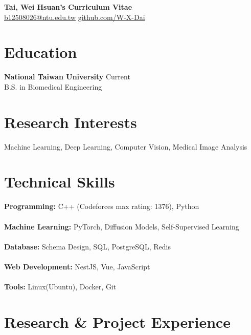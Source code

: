 \documentclass[11pt]{article}
\begin{document}

\begin{center}
{\Large \textbf{Tai, Wei Hsuan's Curriculum Vitae}} \\
\vspace{4pt}
\href{mailto:b12508026@ntu.edu.tw}{b12508026@ntu.edu.tw} \quad
\href{https://github.com/W-X-Dai}{github.com/W-X-Dai}
\end{center}

\vspace{10pt}


\section*{Education}

\textbf{National Taiwan University} \hfill Current \\
B.S. in Biomedical Engineering


\section*{Research Interests}

Machine Learning, Deep Learning, Computer Vision, Medical Image Analysis


\section*{Technical Skills}

\textbf{Programming:} C++ (Codeforces max rating: 1376), Python \\ \\
\textbf{Machine Learning:} PyTorch, Diffusion Models, Self-Supervised Learning \\ \\
\textbf{Database:} Schema Design, SQL, PostgreSQL, Redis \\ \\
\textbf{Web Development:} NestJS, Vue, JavaScript \\ \\
\textbf{Tools:} Linux(Ubuntu), Docker, Git


    
\section*{Research \& Project Experience}
\end{document}
